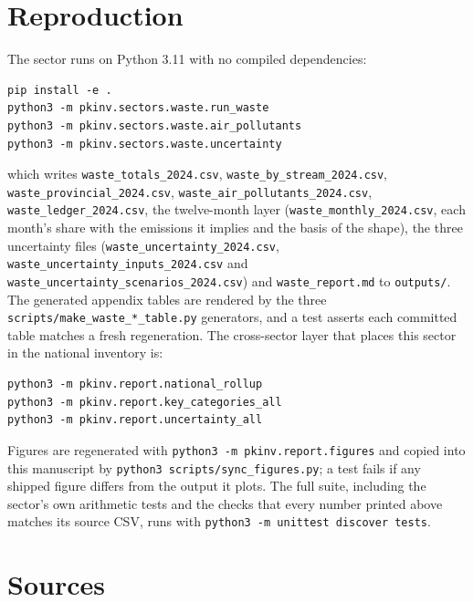 \section{Reproduction}
\label{app:repro}

The sector runs on Python 3.11 with no compiled dependencies:

\begin{verbatim}
pip install -e .
python3 -m pkinv.sectors.waste.run_waste
python3 -m pkinv.sectors.waste.air_pollutants
python3 -m pkinv.sectors.waste.uncertainty
\end{verbatim}

which writes \texttt{waste\_totals\_2024.csv}, \texttt{waste\_by\_stream\_2024.csv},
\texttt{waste\_provincial\_2024.csv}, \texttt{waste\_air\_pollutants\_2024.csv},
\texttt{waste\_ledger\_2024.csv}, the twelve-month layer
(\texttt{waste\_\allowbreak monthly\_\allowbreak 2024.csv}, each month's share with the emissions it implies and
the basis of the shape), the three uncertainty files (\texttt{waste\_\allowbreak uncertainty\_\allowbreak 2024.csv},
\texttt{waste\_\allowbreak uncertainty\_\allowbreak inputs\_\allowbreak 2024.csv} and
\texttt{waste\_\allowbreak uncertainty\_\allowbreak scenarios\_\allowbreak 2024.csv}) and
\texttt{waste\_report.md} to \texttt{outputs/}. The generated appendix tables are rendered
by the three \texttt{scripts/make\_waste\_*\_table.py} generators, and a test asserts each
committed table matches a fresh regeneration. The cross-sector layer that places this sector
in the national inventory is:

\begin{verbatim}
python3 -m pkinv.report.national_rollup
python3 -m pkinv.report.key_categories_all
python3 -m pkinv.report.uncertainty_all
\end{verbatim}

Figures are regenerated with \texttt{python3 -m pkinv.report.figures} and copied into this
manuscript by \texttt{python3 scripts/sync\_figures.py}; a test fails if any shipped figure
differs from the output it plots. The full suite, including the sector's own arithmetic tests
and the checks that every number printed above matches its source CSV, runs with
\texttt{python3 -m unittest discover tests}.

\section{Sources}
\label{app:sources}

